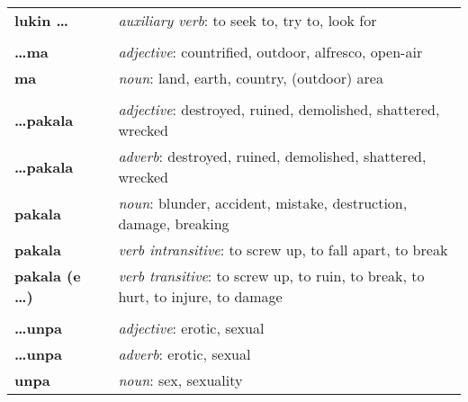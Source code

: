 \begin{supertabular}{p{2,5cm}|ll}
    \textbf{lukin \dots}      &  & \textit{auxiliary verb}: to seek to, try to, look for                                   \\ %
                              &  &                                                                                         \\ %
    \textbf{\dots ma}         &  & \textit{adjective}: countrified, outdoor, alfresco, open-air                            \\ %
    \textbf{ma}               &  & \textit{noun}: land, earth, country, (outdoor) area                                     \\ %
                              &  &                                                                                         \\ %
    \textbf{\dots pakala}     &  & \textit{adjective}: destroyed, ruined, demolished, shattered, wrecked                   \\ %
    \textbf{\dots pakala}     &  & \textit{adverb}: destroyed, ruined, demolished, shattered, wrecked                      \\ %
    \textbf{pakala}           &  & \textit{noun}: blunder, accident, mistake, destruction, damage, breaking                \\ %
    \textbf{pakala}           &  & \textit{verb intransitive}: to screw up, to fall apart, to break                        \\ %
    \textbf{pakala (e \dots)} &  & \textit{verb transitive}: to screw up, to ruin, to break, to hurt, to injure, to damage \\ %
                              &  &                                                                                         \\ %
    \textbf{\dots unpa}       &  & \textit{adjective}: erotic, sexual                                                      \\ %
    \textbf{\dots unpa}       &  & \textit{adverb}: erotic, sexual                                                         \\ %
    \textbf{unpa}             &  & \textit{noun}: sex, sexuality                                                           \\ %

\end{supertabular}

